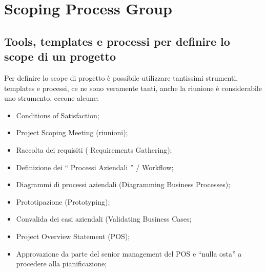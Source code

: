 
\section{Scoping Process Group}
\subsection{Tools, templates e processi per definire lo scope di un progetto}
Per definire lo scope di progetto è possibile utilizzare tantissimi strumenti, templates e processi, ce ne sono veramente tanti, anche la riunione è considerabile uno strumento, eccone alcune:
\begin{itemize}
	\item Conditions of Satisfaction;
	\item Project Scoping Meeting (riunioni);
	\item Raccolta dei requisiti ( Requirements Gathering);
	\item Definizione dei “ Processi Aziendali ” / Workflow;
	\item Diagrammi di processi aziendali (Diagramming Business Processes);
	\item Prototipazione (Prototyping);
	\item Convalida dei casi aziendali (Validating Business Cases;
	\item Project Overview Statement (POS);
	\item Approvazione da parte del senior management del POS e “nulla osta” a procedere alla pianificazione;
\end{itemize}
